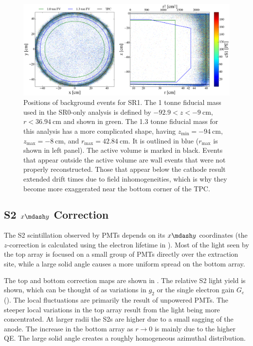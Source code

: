 \begin{figure}
\centering
\includegraphics[width=\textwidth]{FVBoth}
\caption[Positions of background events in SR1 along with the 1 and 1.3 tonne fiducial volumes outlined.]{Positions of background events for
SR1.  The 1 tonne fiducial mass used in the SR0-only analysis is defined by
$-92.9 < z < -9\ \mathrm{cm}$, $r < 36.94\ \mathrm{cm}$ and shown in green.  The 1.3 tonne fiducial mass for this analysis has a more
complicated shape, having $z_\mathrm{min} = -94\ \mathrm{cm}$,
$z_{\mathrm{max}} = -8\ \mathrm{cm}$, and $r_{\mathrm{max}} = 42.84\ \mathrm{cm}$.  It is outlined in blue ($r_{\mathrm{max}}$ is shown
in left panel).  The active volume is marked in black.  Events that appear outside the active volume are wall events that were not
properly
reconstructed.  Those that appear below the cathode result extended drift times due to field inhomogeneities, which is why they
become more exaggerated near the bottom corner of the TPC.}
\label{fig:calibrations_position_reconstruction}
\end{figure}



\subsection{S2 $x \mdash y$ Correction}
\label{subsec:det_char_s2_position_correction}
The S2 scintillation observed by PMTs depends on its $x \mdash y$ coordinates (the $z$-correction is calculated using the electron
lifetime in ).  Most of the light seen by the top array is focused on a small group of PMTs directly
over the extraction site, while a large
solid angle causes a more uniform spread on the bottom array.

The top and bottom correction maps are shown in .  The relative S2 light yield is shown, which can be
thought of as variations in $g_2$ or the single electron gain $G_e$ ().  The local
fluctuations are primarily the result
of unpowered PMTs.  The steeper local variations in the top array result from the light being more concentrated.  At larger radii the
S2s are higher due to a small sagging of the anode.  The increase in the bottom array as $r \rightarrow 0$ is 
mainly due to the higher QE.  The large solid angle creates a roughly homogeneous azimuthal distribution.

